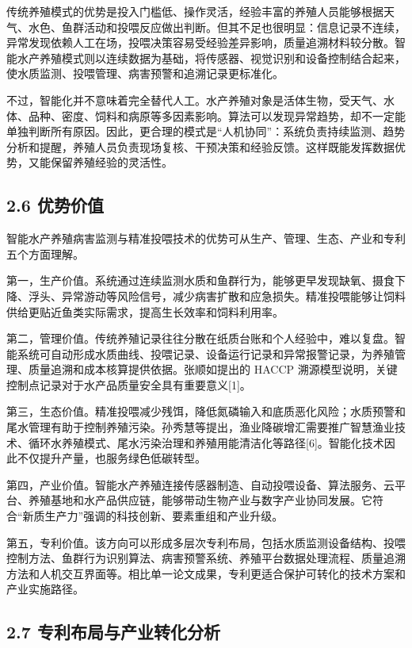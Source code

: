 \documentclass[UTF8,zihao=-4]{ctexart}
\begin{document}
	传统养殖模式的优势是投入门槛低、操作灵活，经验丰富的养殖人员能够根据天气、水色、鱼群活动和投喂反应做出判断。但其不足也很明显：信息记录不连续，异常发现依赖人工在场，投喂决策容易受经验差异影响，质量追溯材料较分散。智能水产养殖模式则以连续数据为基础，将传感器、视觉识别和设备控制结合起来，使水质监测、投喂管理、病害预警和追溯记录更标准化。
	
	不过，智能化并不意味着完全替代人工。水产养殖对象是活体生物，受天气、水体、品种、密度、饲料和病原等多因素影响。算法可以发现异常趋势，却不一定能单独判断所有原因。因此，更合理的模式是“人机协同”：系统负责持续监测、趋势分析和提醒，养殖人员负责现场复核、干预决策和经验反馈。这样既能发挥数据优势，又能保留养殖经验的灵活性。
	
	\subsection*{2.6 优势价值}
	
	智能水产养殖病害监测与精准投喂技术的优势可从生产、管理、生态、产业和专利五个方面理解。
	
	第一，生产价值。系统通过连续监测水质和鱼群行为，能够更早发现缺氧、摄食下降、浮头、异常游动等风险信号，减少病害扩散和应急损失。精准投喂能够让饲料供给更贴近鱼类实际需求，提高生长效率和饲料利用率。
	
	第二，管理价值。传统养殖记录往往分散在纸质台账和个人经验中，难以复盘。智能系统可自动形成水质曲线、投喂记录、设备运行记录和异常报警记录，为养殖管理、质量追溯和成本核算提供依据。张顺如提出的 HACCP 溯源模型说明，关键控制点记录对于水产品质量安全具有重要意义[1]。
	
	第三，生态价值。精准投喂减少残饵，降低氮磷输入和底质恶化风险；水质预警和尾水管理有助于控制养殖污染。孙秀慧等提出，渔业降碳增汇需要推广智慧渔业技术、循环水养殖模式、尾水污染治理和养殖用能清洁化等路径[6]。智能化技术因此不仅提升产量，也服务绿色低碳转型。
	
	第四，产业价值。智能水产养殖连接传感器制造、自动投喂设备、算法服务、云平台、养殖基地和水产品供应链，能够带动生物产业与数字产业协同发展。它符合“新质生产力”强调的科技创新、要素重组和产业升级。
	
	第五，专利价值。该方向可以形成多层次专利布局，包括水质监测设备结构、投喂控制方法、鱼群行为识别算法、病害预警系统、养殖平台数据处理流程、质量追溯方法和人机交互界面等。相比单一论文成果，专利更适合保护可转化的技术方案和产业实施路径。
	
	\subsection*{2.7 专利布局与产业转化分析}
	
\end{document}
